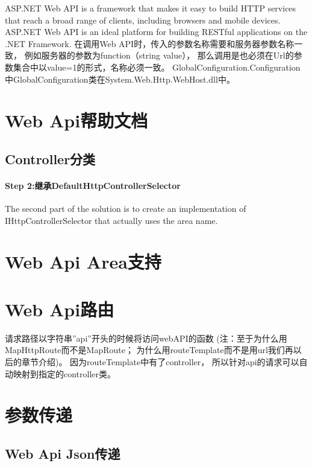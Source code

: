\documentclass{book}
\begin{document}
\clearpage
\mbox{}         
\clearpage

ASP.NET Web API is a framework that makes it easy to build 
HTTP services that reach a broad range of clients, 
including browsers and mobile devices. 
ASP.NET Web API is an ideal platform for building RESTful applications on the .NET Framework.
在调用Web API时，传入的参数名称需要和服务器参数名称一致，
例如服务器的参数为function（string value），
那么调用是也必须在Url的参数集合中以value=1的形式，名称必须一致。
GlobalConfiguration.Configuration中GlobalConfiguration类在System.Web.Http.WebHost.dll中。

\section{Web Api帮助文档}

\subsection{Controller分类}

\paragraph{Step 2:继承DefaultHttpControllerSelector}The second part of the solution is to create an implementation of IHttpControllerSelector that actually uses the area name. 





\section{Web Api Area支持}

\section{Web Api路由}

请求路径以字符串”api”开头的时候将访问webAPI的函数
(注：至于为什么用MapHttpRoute而不是MapRoute；
为什么用routeTemplate而不是用url我们再以后的章节介绍)。
因为routeTemplate中有了{controller}，
所以针对api的请求可以自动映射到指定的controller类。


\section{参数传递}


\subsection{Web Api Json传递}
\end{document}
